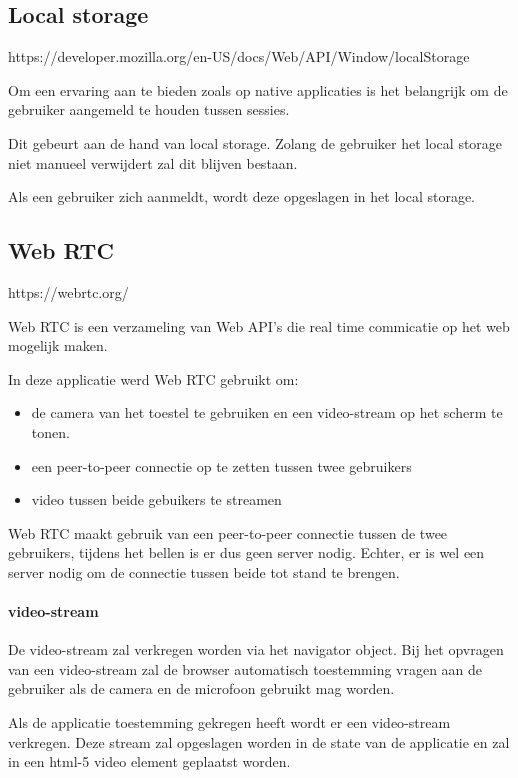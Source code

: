 	\subsection{Local storage}
	
		https://developer.mozilla.org/en-US/docs/Web/API/Window/localStorage
		
		Om een ervaring aan te bieden zoals op native applicaties is het belangrijk om de gebruiker aangemeld te houden tussen sessies.
		
		Dit gebeurt aan de hand van local storage. Zolang de gebruiker het local storage niet manueel verwijdert zal dit blijven bestaan. 
		
		Als een gebruiker zich aanmeldt, wordt deze opgeslagen in het local storage.
		

	\subsection{Web RTC}
		https://webrtc.org/
		
		Web RTC is een verzameling van Web API's die real time commicatie op het web mogelijk maken. 
		
		In deze applicatie werd Web RTC gebruikt om:
		\begin{itemize}
			\item de camera van het toestel te gebruiken en een video-stream op het scherm te tonen.
			\item een peer-to-peer connectie op te zetten tussen twee gebruikers
			\item video tussen beide gebuikers te streamen
		\end{itemize} 
		
		Web RTC maakt gebruik van een peer-to-peer connectie tussen de twee gebruikers, tijdens het bellen is er dus geen server nodig. Echter, er is wel een server nodig om de connectie tussen beide tot stand te brengen.
		
		\paragraph{video-stream}
			De video-stream zal verkregen worden via het navigator object. Bij het opvragen van een video-stream zal de browser automatisch toestemming vragen aan de gebruiker als de camera en de microfoon gebruikt mag worden.
			
			Als de applicatie toestemming gekregen heeft wordt er een video-stream verkregen.
			Deze stream zal opgeslagen worden in de state van de applicatie en zal in een html-5 video element geplaatst worden.
		
